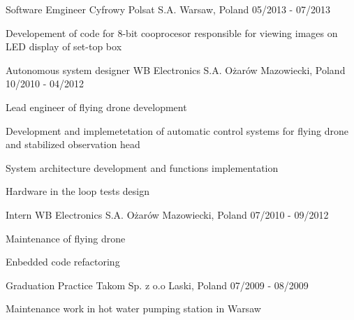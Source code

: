 \begin{cventries}
  \cventry
    {Software Emgineer} %
    {Cyfrowy Polsat S.A.} %
    {Warsaw, Poland} %
    {05/2013 - 07/2013} %
    {
      \begin{cvitems} %
        \item {Developement of code for 8-bit cooprocesor responsible for viewing images on LED
          display of set-top box}
      \end{cvitems}
    }

  \cventry
    {Autonomous system designer} %
    {WB Electronics S.A.} %
    {Ożarów Mazowiecki, Poland} %
    {10/2010 - 04/2012} %
    {
      \begin{cvitems} %
        \item {Lead engineer of flying drone development}
        \item {Development and implemetetation of automatic control systems for flying drone and
          stabilized observation head}
        \item {System architecture development and functions implementation}
        \item {Hardware in the loop tests design}
      \end{cvitems}
    }

  \cventry
    {Intern} %
    {WB Electronics S.A.} %
    {Ożarów Mazowiecki, Poland} %
    {07/2010 - 09/2012} %
    {
      \begin{cvitems} %
        \item {Maintenance of flying drone}
        \item {Enbedded code refactoring}
      \end{cvitems}
    }

  \cventry
    {Graduation Practice} %
    {Takom Sp. z o.o} %
    {Laski, Poland} %
    {07/2009 - 08/2009} %
    {
      \begin{cvitems} %
        \item {Maintenance work in hot water pumping station in Warsaw}
      \end{cvitems}
    }


\end{cventries}
